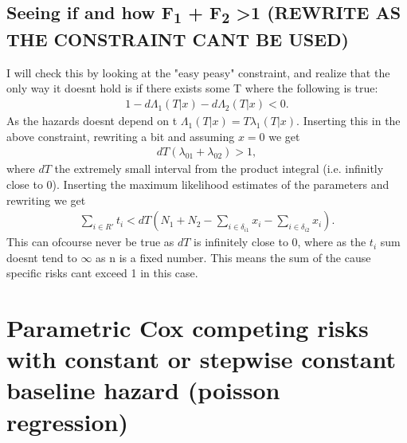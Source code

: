 \documentclass[11pt]{article}
\begin{document}
\subsection{Seeing if and how F\textsubscript{1} + F\textsubscript{2} >1 (REWRITE AS THE CONSTRAINT CANT BE USED)}
\label{sec:orgd224885}

I will check this by looking at the "easy peasy" constraint, and realize that the only way it doesnt hold is if there exists some T where the following is true:
\begin{align*}
1-d\Lambda_1(T|x)-d\Lambda_2(T|x)<0.
\end{align*}
As the hazards doesnt depend on t \(\Lambda_1(T|x) = T\lambda_1(T|x)\). Inserting this in the above constraint, rewriting a bit and assuming \(x = 0\) we get
\begin{align*}
dT(\lambda_{01}+\lambda_{02})>1,
\end{align*}
where \(dT\) the extremely small interval from the product integral (i.e. infinitly close to 0). Inserting the maximum likelihood estimates of the parameters and rewriting we get
\begin{align*}
\sum_{i\in R'}t_i<dT(N_1+N_2-\sum_{i\in\delta_{i1}}x_i-\sum_{i\in\delta_{i2}}x_i).
\end{align*}
This can ofcourse never be true as \(dT\) is infinitely close to 0, where as the \(t_i\) sum doesnt tend to \(\infty\) as n is a fixed number. This means the sum of the cause specific risks cant exceed 1 in this case.


\section{Parametric Cox competing risks with constant or stepwise constant baseline hazard (poisson regression)}
\label{sec:orged85c94}
\end{document}

